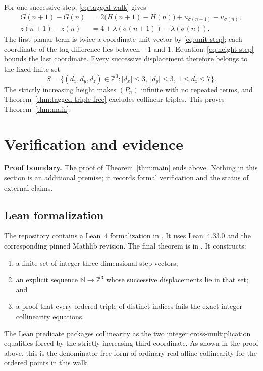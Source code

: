 \documentclass[11pt]{article}
\theoremstyle{definition}
\theoremstyle{remark}
\newcommand{\Z}{\mathbb Z}
\newcommand{\N}{\mathbb N}
\newcommand{\abs}[1]{\lvert#1\rvert}
\begin{document}
For one successive step, \eqref{eq:tagged-walk} gives
\[
\begin{aligned}
 G(n+1)-G(n)
 &=2\bigl(H(n+1)-H(n)\bigr)
   +u_{\sigma(n+1)}-u_{\sigma(n)},\\
 z(n+1)-z(n)
 &=4+\lambda(\sigma(n+1))-\lambda(\sigma(n)).
\end{aligned}
\]
The first planar term is twice a coordinate unit vector by
\eqref{eq:unit-step}; each coordinate of the tag difference lies between
$-1$ and $1$.  Equation~\eqref{eq:height-step} bounds the last coordinate.
Every successive displacement therefore belongs to the fixed finite set
\begin{equation}\label{eq:menu}
 S=\{(d_x,d_y,d_z)\in\Z^3:
       \abs{d_x}\le3,\ \abs{d_y}\le3,\ 1\le d_z\le7\}.
\end{equation}
The strictly increasing height makes $(P_n)$ infinite with no repeated
terms, and Theorem~\ref{thm:tagged-triple-free} excludes collinear triples.
This proves Theorem~\ref{thm:main}.

\section{Verification and evidence}\label{sec:formal}

\noindent\textbf{Proof boundary.}
The proof of Theorem~\ref{thm:main} ends above.  Nothing in this section is an
additional premise; it records formal verification and the status of external
claims.

\subsection{Lean formalization}

The repository \cite{Repository} contains a Lean~4 formalization in
.  It uses Lean~4.33.0 and the corresponding pinned
Mathlib revision.  The final theorem is
 in
.  It constructs:
\begin{enumerate}[nosep]
\item a finite set of integer three-dimensional step vectors;
\item an explicit sequence $\N\to\Z^3$ whose successive displacements lie in
      that set; and
\item a proof that every ordered triple of distinct indices fails the exact
      integer collinearity equations.
\end{enumerate}
The Lean predicate packages collinearity as the two integer
cross-multiplication equalities forced by the strictly increasing third
coordinate.  As shown in the proof above, this is the denominator-free form
of ordinary real affine collinearity for the ordered points in this walk.
\end{document}
